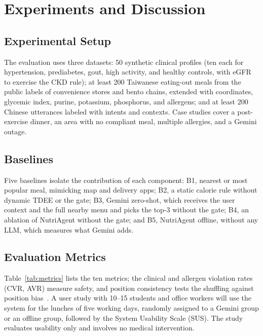 \section{Experiments and Discussion}
\label{sec:experiments}

\subsection{Experimental Setup}
The evaluation uses three datasets: 50 synthetic clinical profiles (ten each
for hypertension, prediabetes, gout, high activity, and healthy controls, with
eGFR to exercise the CKD rule); at least 200 Taiwanese eating-out meals from the
public labels of convenience stores and bento chains, extended with
coordinates, glycemic index, purine, potassium, phosphorus, and allergens; and
at least 200 Chinese utterances labeled with intents and contexts. Case studies
cover a post-exercise dinner, an area with no compliant meal, multiple
allergies, and a Gemini outage.

\subsection{Baselines}
Five baselines isolate the contribution of each component:
B1, nearest or most popular meal, mimicking map and delivery apps;
B2, a static calorie rule without dynamic TDEE or the gate;
B3, Gemini zero-shot, which receives the user context and the full nearby menu
and picks the top-3 without the gate;
B4, an ablation of NutriAgent without the gate; and
B5, NutriAgent offline, without any LLM, which measures what Gemini adds.

\subsection{Evaluation Metrics}
Table~\ref{tab:metrics} lists the ten metrics; the clinical and allergen
violation rates (CVR, AVR) measure safety, and position consistency tests the
shuffling against position bias~\cite{hou2024llmrank}. A user study with 10--15 students and
office workers will use the system for the lunches of five working days,
randomly assigned to a Gemini group or an offline group, followed by the System
Usability Scale (SUS). The study evaluates usability only and involves no
medical intervention.


